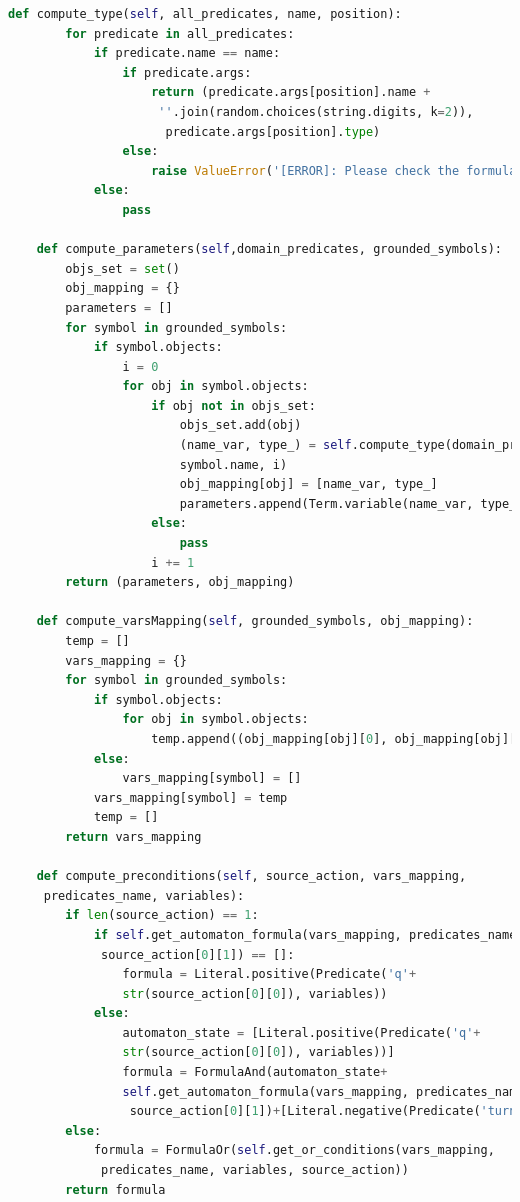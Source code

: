 \begin{lstlisting}[language=Python, style=Python, escapechar = £,  label={code:fond-automa}, caption={The \texttt{Automa} class.}]
    def compute_type(self, all_predicates, name, position):
        for predicate in all_predicates:
            if predicate.name == name:
                if predicate.args:
                    return (predicate.args[position].name +
                     ''.join(random.choices(string.digits, k=2)),
                      predicate.args[position].type)
                else:
                    raise ValueError('[ERROR]: Please check the formula')
            else:
                pass

    def compute_parameters(self,domain_predicates, grounded_symbols):
        objs_set = set()
        obj_mapping = {}
        parameters = []
        for symbol in grounded_symbols:
            if symbol.objects:
                i = 0
                for obj in symbol.objects:
                    if obj not in objs_set:
                        objs_set.add(obj)
                        (name_var, type_) = self.compute_type(domain_predicates, 
                        symbol.name, i)
                        obj_mapping[obj] = [name_var, type_]
                        parameters.append(Term.variable(name_var, type_))
                    else:
                        pass
                    i += 1
        return (parameters, obj_mapping)

    def compute_varsMapping(self, grounded_symbols, obj_mapping):
        temp = []
        vars_mapping = {}
        for symbol in grounded_symbols:
            if symbol.objects:
                for obj in symbol.objects:
                    temp.append((obj_mapping[obj][0], obj_mapping[obj][1]))
            else:
                vars_mapping[symbol] = []
            vars_mapping[symbol] = temp
            temp = []
        return vars_mapping

    def compute_preconditions(self, source_action, vars_mapping,
     predicates_name, variables):
        if len(source_action) == 1:
            if self.get_automaton_formula(vars_mapping, predicates_name,
             source_action[0][1]) == []:
                formula = Literal.positive(Predicate('q'+
                str(source_action[0][0]), variables))
            else:
                automaton_state = [Literal.positive(Predicate('q'+
                str(source_action[0][0]), variables))]
                formula = FormulaAnd(automaton_state+
                self.get_automaton_formula(vars_mapping, predicates_name,
                 source_action[0][1])+[Literal.negative(Predicate('turnDomain'))])
        else:
            formula = FormulaOr(self.get_or_conditions(vars_mapping,
             predicates_name, variables, source_action))
        return formula


\end{lstlisting}

